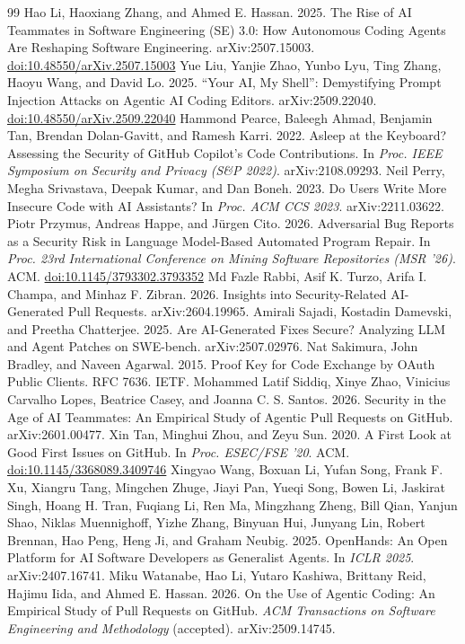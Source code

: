 \documentclass[acmsmall,screen,nonacm]{acmart}
\providecommand{\doi}[1]{\href{https://doi.org/#1}{doi:#1}}
\begin{document}
\begin{thebibliography}{99}
 Hao Li, Haoxiang Zhang, and Ahmed E. Hassan. 2025. The Rise of AI Teammates in Software Engineering (SE) 3.0: How Autonomous Coding Agents Are Reshaping Software Engineering. arXiv:2507.15003. \doi{10.48550/arXiv.2507.15003}
 Yue Liu, Yanjie Zhao, Yunbo Lyu, Ting Zhang, Haoyu Wang, and David Lo. 2025. ``Your AI, My Shell'': Demystifying Prompt Injection Attacks on Agentic AI Coding Editors. arXiv:2509.22040. \doi{10.48550/arXiv.2509.22040}
 Hammond Pearce, Baleegh Ahmad, Benjamin Tan, Brendan Dolan-Gavitt, and Ramesh Karri. 2022. Asleep at the Keyboard? Assessing the Security of GitHub Copilot's Code Contributions. In \emph{Proc. IEEE Symposium on Security and Privacy (S\&P 2022)}. arXiv:2108.09293.
 Neil Perry, Megha Srivastava, Deepak Kumar, and Dan Boneh. 2023. Do Users Write More Insecure Code with AI Assistants? In \emph{Proc. ACM CCS 2023}. arXiv:2211.03622.
 Piotr Przymus, Andreas Happe, and J\"urgen Cito. 2026. Adversarial Bug Reports as a Security Risk in Language Model-Based Automated Program Repair. In \emph{Proc. 23rd International Conference on Mining Software Repositories (MSR '26)}. ACM. \doi{10.1145/3793302.3793352}
 Md Fazle Rabbi, Asif K. Turzo, Arifa I. Champa, and Minhaz F. Zibran. 2026. Insights into Security-Related AI-Generated Pull Requests. arXiv:2604.19965.
 Amirali Sajadi, Kostadin Damevski, and Preetha Chatterjee. 2025. Are AI-Generated Fixes Secure? Analyzing LLM and Agent Patches on SWE-bench. arXiv:2507.02976.
 Nat Sakimura, John Bradley, and Naveen Agarwal. 2015. Proof Key for Code Exchange by OAuth Public Clients. RFC 7636. IETF.
 Mohammed Latif Siddiq, Xinye Zhao, Vinicius Carvalho Lopes, Beatrice Casey, and Joanna C. S. Santos. 2026. Security in the Age of AI Teammates: An Empirical Study of Agentic Pull Requests on GitHub. arXiv:2601.00477.
 Xin Tan, Minghui Zhou, and Zeyu Sun. 2020. A First Look at Good First Issues on GitHub. In \emph{Proc. ESEC/FSE '20}. ACM. \doi{10.1145/3368089.3409746}
 Xingyao Wang, Boxuan Li, Yufan Song, Frank F. Xu, Xiangru Tang, Mingchen Zhuge, Jiayi Pan, Yueqi Song, Bowen Li, Jaskirat Singh, Hoang H. Tran, Fuqiang Li, Ren Ma, Mingzhang Zheng, Bill Qian, Yanjun Shao, Niklas Muennighoff, Yizhe Zhang, Binyuan Hui, Junyang Lin, Robert Brennan, Hao Peng, Heng Ji, and Graham Neubig. 2025. OpenHands: An Open Platform for AI Software Developers as Generalist Agents. In \emph{ICLR 2025}. arXiv:2407.16741.
 Miku Watanabe, Hao Li, Yutaro Kashiwa, Brittany Reid, Hajimu Iida, and Ahmed E. Hassan. 2026. On the Use of Agentic Coding: An Empirical Study of Pull Requests on GitHub. \emph{ACM Transactions on Software Engineering and Methodology} (accepted). arXiv:2509.14745.

\end{thebibliography}
\end{document}
